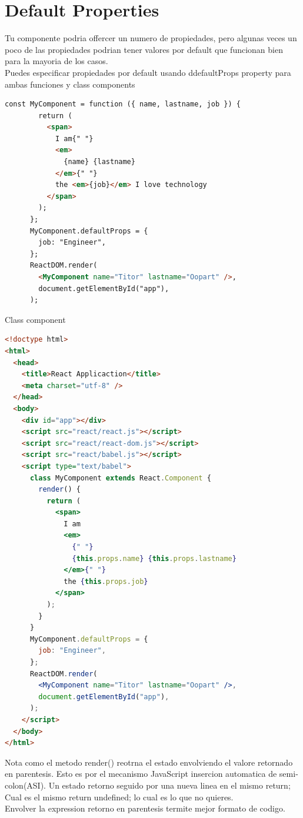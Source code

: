 \section{Default Properties}
Tu componente podria offercer un numero de propiedades, pero algunas veces un poco de las propiedades podrian tener valores por default que funcionan bien para la mayoria de los casos. \\
Puedes especificar propiedades por default usando ddefaultProps property para ambas funciones y class components
\begin{lstlisting}[language=html]
const MyComponent = function ({ name, lastname, job }) {
        return (
          <span>
            I am{" "}
            <em>
              {name} {lastname}
            </em>{" "}
            the <em>{job}</em> I love technology
          </span>
        );
      };
      MyComponent.defaultProps = {
        job: "Engineer",
      };
      ReactDOM.render(
        <MyComponent name="Titor" lastname="Oopart" />,
        document.getElementById("app"),
      );
\end{lstlisting}
Class component
\begin{lstlisting}[language=html]
<!doctype html>
<html>
  <head>
    <title>React Applicaction</title>
    <meta charset="utf-8" />
  </head>
  <body>
    <div id="app"></div>
    <script src="react/react.js"></script>
    <script src="react/react-dom.js"></script>
    <script src="react/babel.js"></script>
    <script type="text/babel">
      class MyComponent extends React.Component {
        render() {
          return (
            <span>
              I am
              <em>
                {" "}
                {this.props.name} {this.props.lastname}
              </em>{" "}
              the {this.props.job}
            </span>
          );
        }
      }
      MyComponent.defaultProps = {
        job: "Engineer",
      };
      ReactDOM.render(
        <MyComponent name="Titor" lastname="Oopart" />,
        document.getElementById("app"),
      );
    </script>
  </body>
</html>
\end{lstlisting}
Nota como el metodo render() reotrna el estado envolviendo el valore retornado en parentesis. Esto es por el mecanismo JavaScript insercion automatica de semi-colon(ASI). Un estado retorno seguido por una nueva linea en el mismo return; Cual es el mismo return undefined; lo cual es lo que no quieres.\\
Envolver la expression retorno en parentesis termite mejor formato de codigo.
